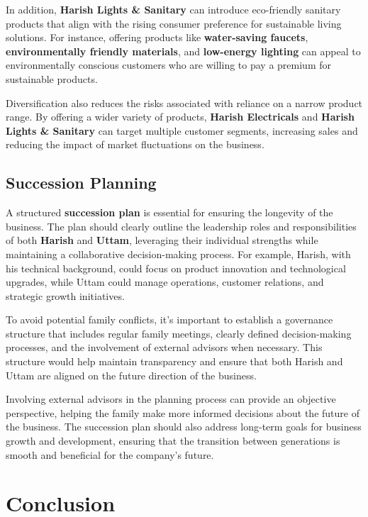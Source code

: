 \documentclass[a4paper,12pt]{report}
\begin{document}
In addition, \textbf{Harish Lights \& Sanitary} can introduce eco-friendly sanitary products that align with the rising consumer preference for sustainable living solutions. For instance, offering products like \textbf{water-saving faucets}, \textbf{environmentally friendly materials}, and \textbf{low-energy lighting} can appeal to environmentally conscious customers who are willing to pay a premium for sustainable products.

Diversification also reduces the risks associated with reliance on a narrow product range. By offering a wider variety of products, \textbf{Harish Electricals} and \textbf{Harish Lights \& Sanitary} can target multiple customer segments, increasing sales and reducing the impact of market fluctuations on the business.

\section{Succession Planning}
A structured \textbf{succession plan} is essential for ensuring the longevity of the business. The plan should clearly outline the leadership roles and responsibilities of both \textbf{Harish} and \textbf{Uttam}, leveraging their individual strengths while maintaining a collaborative decision-making process. For example, Harish, with his technical background, could focus on product innovation and technological upgrades, while Uttam could manage operations, customer relations, and strategic growth initiatives.

To avoid potential family conflicts, it’s important to establish a governance structure that includes regular family meetings, clearly defined decision-making processes, and the involvement of external advisors when necessary. This structure would help maintain transparency and ensure that both Harish and Uttam are aligned on the future direction of the business.

Involving external advisors in the planning process can provide an objective perspective, helping the family make more informed decisions about the future of the business. The succession plan should also address long-term goals for business growth and development, ensuring that the transition between generations is smooth and beneficial for the company’s future.




\chapter{Conclusion}
\end{document}
